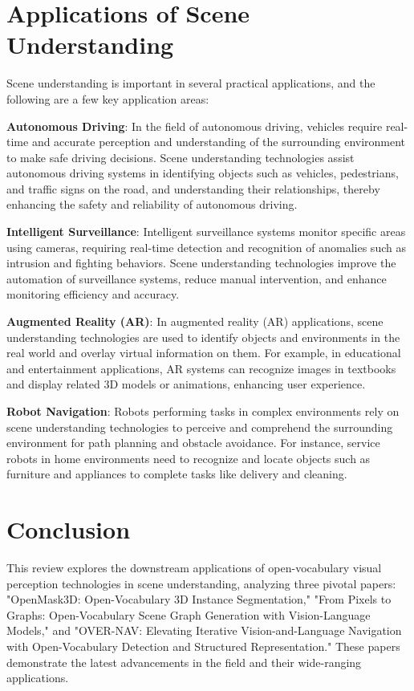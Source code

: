 
\section{Applications of Scene Understanding}

Scene understanding is important in several practical applications, and the following are a few key application areas:

    	\textbf{Autonomous Driving}: In the field of autonomous driving, vehicles require real-time and accurate perception and understanding of the surrounding environment to make safe driving decisions. Scene understanding technologies assist autonomous driving systems in identifying objects such as vehicles, pedestrians, and traffic signs on the road, and understanding their relationships, thereby enhancing the safety and reliability of autonomous driving.

    	\textbf{Intelligent Surveillance}: Intelligent surveillance systems monitor specific areas using cameras, requiring real-time detection and recognition of anomalies such as intrusion and fighting behaviors. Scene understanding technologies improve the automation of surveillance systems, reduce manual intervention, and enhance monitoring efficiency and accuracy.

    	\textbf{Augmented Reality (AR)}: In augmented reality (AR) applications, scene understanding technologies are used to identify objects and environments in the real world and overlay virtual information on them. For example, in educational and entertainment applications, AR systems can recognize images in textbooks and display related 3D models or animations, enhancing user experience.

	\textbf{Robot Navigation}: Robots performing tasks in complex environments rely on scene understanding technologies to perceive and comprehend the surrounding environment for path planning and obstacle avoidance. For instance, service robots in home environments need to recognize and locate objects such as furniture and appliances to complete tasks like delivery and cleaning.

\section{Conclusion}
This review explores the downstream applications of open-vocabulary visual perception technologies in scene understanding, analyzing three pivotal papers: "OpenMask3D: Open-Vocabulary 3D Instance Segmentation," "From Pixels to Graphs: Open-Vocabulary Scene Graph Generation with Vision-Language Models," and "OVER-NAV: Elevating Iterative Vision-and-Language Navigation with Open-Vocabulary Detection and Structured Representation." These papers demonstrate the latest advancements in the field and their wide-ranging applications.

